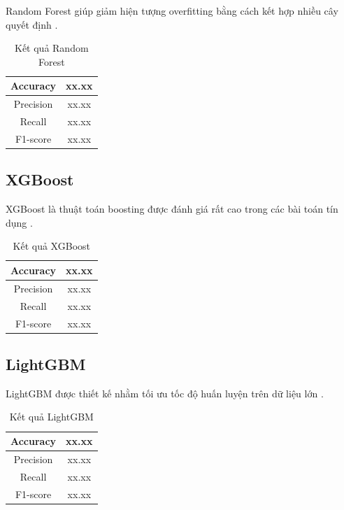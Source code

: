 Random Forest giúp giảm hiện tượng overfitting bằng cách kết hợp nhiều cây quyết định \cite{breiman2001random}.

\begin{table}[H]
\centering
\caption{Kết quả Random Forest}
\label{tab:rf_result}
\begin{tabular}{|c|c|}
\hline
Accuracy & xx.xx \\
\hline
Precision & xx.xx \\
\hline
Recall & xx.xx \\
\hline
F1-score & xx.xx \\
\hline
\end{tabular}
\end{table}

\subsection{XGBoost}

XGBoost là thuật toán boosting được đánh giá rất cao trong các bài toán tín dụng \cite{chen2016xgboost}.

\begin{table}[H]
\centering
\caption{Kết quả XGBoost}
\label{tab:xgb_result}
\begin{tabular}{|c|c|}
\hline
Accuracy & xx.xx \\
\hline
Precision & xx.xx \\
\hline
Recall & xx.xx \\
\hline
F1-score & xx.xx \\
\hline
\end{tabular}
\end{table}

\subsection{LightGBM}

LightGBM được thiết kế nhằm tối ưu tốc độ huấn luyện trên dữ liệu lớn \cite{ke2017lightgbm}.

\begin{table}[H]
\centering
\caption{Kết quả LightGBM}
\label{tab:lgb_result}
\begin{tabular}{|c|c|}
\hline
Accuracy & xx.xx \\
\hline
Precision & xx.xx \\
\hline
Recall & xx.xx \\
\hline
F1-score & xx.xx \\
\hline
\end{tabular}
\end{table}

